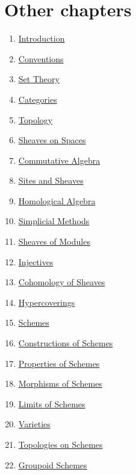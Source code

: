 \section{Other chapters}

\begin{multicols}{2}
\begin{enumerate}
\item \hyperref[introduction-section-overview]{Introduction}
\item \hyperref[conventions-section-comments]{Conventions}
\item \hyperref[sets-section-introduction]{Set Theory}
\item \hyperref[categories-section-introduction]{Categories}
\item \hyperref[topology-section-introduction]{Topology}
\item \hyperref[sheaves-section-introduction]{Sheaves on Spaces}
\item \hyperref[algebra-section-introduction]{Commutative Algebra}
\item \hyperref[sites-section-introduction]{Sites and Sheaves}
\item \hyperref[homology-section-introduction]{Homological Algebra}
\item \hyperref[simplicial-section-introduction]{Simplicial Methods}
\item \hyperref[modules-section-introduction]{Sheaves of Modules}
\item \hyperref[injectives-section-introduction]{Injectives}
\item \hyperref[cohomology-section-introduction]{Cohomology of Sheaves}
\item \hyperref[hypercovering-section-introduction]{Hypercoverings}
\item \hyperref[schemes-section-introduction]{Schemes}
\item \hyperref[constructions-section-introduction]{Constructions of Schemes}
\item \hyperref[properties-section-introduction]{Properties of Schemes}
\item \hyperref[morphisms-section-introduction]{Morphisms of Schemes}
\item \hyperref[limits-section-introduction]{Limits of Schemes}
\item \hyperref[varieties-section-introduction]{Varieties}
\item \hyperref[topologies-section-introduction]{Topologies on Schemes}
\item \hyperref[groupoids-section-introduction]{Groupoid Schemes}

\end{enumerate}
\end{multicols}
